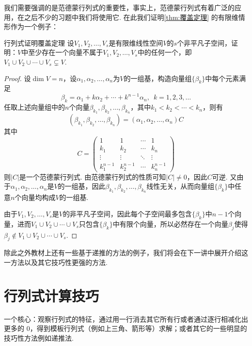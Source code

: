  我们需要强调的是范德蒙行列式的重要性，事实上，范德蒙行列式有着广泛的应用，在之后不少的习题中我们将使用它. 在此我们证明\autoref{thm:覆盖定理} 的有限维情形作为一个例子：
\begin{example}{}{行列式证明覆盖定理}
    设$V_1,V_2,\ldots,V_s$是有限维线性空间$V$的$s$个非平凡子空间，证明：$V$中至少存在一个向量不属于$V_1,V_2,\ldots,V_s$中的任何一个，即$V_1 \cup V_2 \cup \cdots \cup V_s\subsetneq V$.
\end{example}

\begin{proof}
    设$\dim V=n$，设$\alpha_1,\alpha_2,\ldots,\alpha_n$为$V$的一组基，构造向量组$\{\beta_k\}$中每个元素满足
    \[\beta_k=\alpha_1+k\alpha_2+\cdots+k^{n-1}\alpha_n,\enspace k=1,2,3,\ldots\]
    任取上述向量组中的$n$个向量$\beta_{k_1},\beta_{k_2},\ldots,\beta_{k_n}$，其中$k_1<k_2<\cdots<k_n$，则有
    \[(\beta_{k_1},\beta_{k_2},\ldots,\beta_{k_n})=(\alpha_1,\alpha_2,\ldots,\alpha_n)C\]
    其中
    \[C=\begin{pmatrix}
            1         & 1         & \cdots & 1         \\
            k_1       & k_2       & \cdots & k_n       \\
            \vdots    & \vdots    & \ddots & \vdots    \\
            k_1^{n-1} & k_2^{n-1} & \cdots & k_n^{n-1}
        \end{pmatrix}\]
    则$|C|$是一个范德蒙行列式. 由范德蒙行列式的性质可知$|C| \neq 0$，因此$C$可逆. 又由于$\alpha_1,\alpha_2,\ldots,\alpha_n$是$V$的一组基，因此$\beta_{k_1},\beta_{k_2},\ldots,\beta_{k_n}$线性无关，从而向量组$\{\beta_k\}$中任意$n$个向量均构成$V$的一组基.

    由于$V_1,V_2,\ldots,V_s$是$V$的非平凡子空间，因此每个子空间最多包含$\{\beta_k\}$中$n-1$个向量，进而$V_1\cup V_2\cup\cdots\cup V_s$只包含$\{\beta_k\}$中有限个向量，所以必然存在一个向量$\beta_j$使得$\beta_j \notin V_1\cup V_2\cup\cdots\cup V_s$.
\end{proof}

除此之外教材上还有一些基于递推的方法的例子，我们将会在下一讲中展开介绍这一方法以及其它技巧性更强的方法.

\section{行列式计算技巧}

一个核心：观察行列式的特征，通过用一行消去其它所有行或者通过逐行相减化出更多的 $0$，得到模板行列式（例如上三角、箭形等）求解；或者其它的一些明显的技巧性方法例如递推法.


